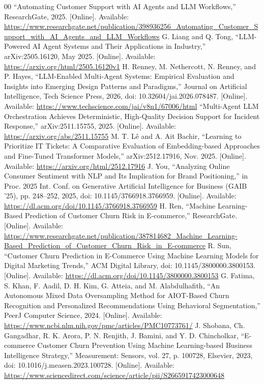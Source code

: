 \documentclass[conference]{IEEEtran}
\begin{document}
\begin{thebibliography}{00}
 ``Automating Customer Support with AI Agents and LLM Workflows,'' ResearchGate, 2025. [Online]. Available: \url{https://www.researchgate.net/publication/398936256_Automating_Customer_Support_with_AI_Agents_and_LLM_Workflows}
 G. Liang and Q. Tong, ``LLM-Powered AI Agent Systems and Their Applications in Industry,'' arXiv:2505.16120, May 2025. [Online]. Available: \url{https://arxiv.org/html/2505.16120v1}
 H. Renney, M. Nethercott, N. Renney, and P. Hayes, ``LLM-Enabled Multi-Agent Systems: Empirical Evaluation and Insights into Emerging Design Patterns and Paradigms,'' Journal on Artificial Intelligence, Tech Science Press, 2026, doi: 10.32604/jai.2026.078487. [Online]. Available: \url{https://www.techscience.com/jai/v8n1/67006/html}
 ``Multi-Agent LLM Orchestration Achieves Deterministic, High-Quality Decision Support for Incident Response,'' arXiv:2511.15755, 2025. [Online]. Available: \url{https://arxiv.org/abs/2511.15755}
 M. T. Lê and A. Ait Bachir, ``Learning to Prioritize IT Tickets: A Comparative Evaluation of Embedding-based Approaches and Fine-Tuned Transformer Models,'' arXiv:2512.17916, Nov. 2025. [Online]. Available: \url{https://arxiv.org/html/2512.17916}
 J. You, ``Analyzing Online Consumer Sentiment with NLP and Its Implication for Brand Positioning,'' in Proc. 2025 Int. Conf. on Generative Artificial Intelligence for Business (GAIB '25), pp. 248--252, 2025, doi: 10.1145/3766918.3766959. [Online]. Available: \url{https://dl.acm.org/doi/10.1145/3766918.3766959}
 H. Ren, ``Machine Learning-Based Prediction of Customer Churn Risk in E-commerce,'' ResearchGate. [Online]. Available: \url{https://www.researchgate.net/publication/387814682_Machine_Learning-Based_Prediction_of_Customer_Churn_Risk_in_E-commerce}
 R. Sun, ``Customer Churn Prediction in E-Commerce Using Machine Learning Models for Digital Marketing Trends,'' ACM Digital Library, doi: 10.1145/3800000.3800153. [Online]. Available: \url{https://dl.acm.org/doi/10.1145/3800000.3800153}
 G. Fatima, S. Khan, F. Aadil, D. H. Kim, G. Atteia, and M. Alabdulhafith, ``An Autonomous Mixed Data Oversampling Method for AIOT-Based Churn Recognition and Personalized Recommendations Using Behavioral Segmentation,'' PeerJ Computer Science, 2024. [Online]. Available: \url{https://www.ncbi.nlm.nih.gov/pmc/articles/PMC10773761/}
 J. Shobana, Ch. Gangadhar, R. K. Arora, P. N. Renjith, J. Bamini, and Y. D. Chincholkar, ``E-commerce Customer Churn Prevention Using Machine Learning-based Business Intelligence Strategy,'' Measurement: Sensors, vol. 27, p. 100728, Elsevier, 2023, doi: 10.1016/j.measen.2023.100728. [Online]. Available: \url{https://www.sciencedirect.com/science/article/pii/S2665917423000648}
\end{thebibliography}
\end{document}

